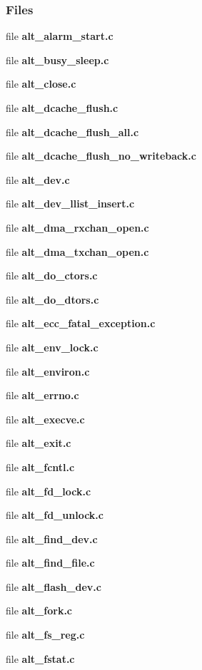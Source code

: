 \subsubsection*{Files}
\begin{DoxyCompactItemize}
\item 
file {\bf alt\+\_\+alarm\+\_\+start.\+c}
\item 
file {\bf alt\+\_\+busy\+\_\+sleep.\+c}
\item 
file {\bf alt\+\_\+close.\+c}
\item 
file {\bf alt\+\_\+dcache\+\_\+flush.\+c}
\item 
file {\bf alt\+\_\+dcache\+\_\+flush\+\_\+all.\+c}
\item 
file {\bf alt\+\_\+dcache\+\_\+flush\+\_\+no\+\_\+writeback.\+c}
\item 
file {\bf alt\+\_\+dev.\+c}
\item 
file {\bf alt\+\_\+dev\+\_\+llist\+\_\+insert.\+c}
\item 
file {\bf alt\+\_\+dma\+\_\+rxchan\+\_\+open.\+c}
\item 
file {\bf alt\+\_\+dma\+\_\+txchan\+\_\+open.\+c}
\item 
file {\bf alt\+\_\+do\+\_\+ctors.\+c}
\item 
file {\bf alt\+\_\+do\+\_\+dtors.\+c}
\item 
file {\bf alt\+\_\+ecc\+\_\+fatal\+\_\+exception.\+c}
\item 
file {\bf alt\+\_\+env\+\_\+lock.\+c}
\item 
file {\bf alt\+\_\+environ.\+c}
\item 
file {\bf alt\+\_\+errno.\+c}
\item 
file {\bf alt\+\_\+execve.\+c}
\item 
file {\bf alt\+\_\+exit.\+c}
\item 
file {\bf alt\+\_\+fcntl.\+c}
\item 
file {\bf alt\+\_\+fd\+\_\+lock.\+c}
\item 
file {\bf alt\+\_\+fd\+\_\+unlock.\+c}
\item 
file {\bf alt\+\_\+find\+\_\+dev.\+c}
\item 
file {\bf alt\+\_\+find\+\_\+file.\+c}
\item 
file {\bf alt\+\_\+flash\+\_\+dev.\+c}
\item 
file {\bf alt\+\_\+fork.\+c}
\item 
file {\bf alt\+\_\+fs\+\_\+reg.\+c}
\item 
file {\bf alt\+\_\+fstat.\+c}
\item 

\end{DoxyCompactItemize}
